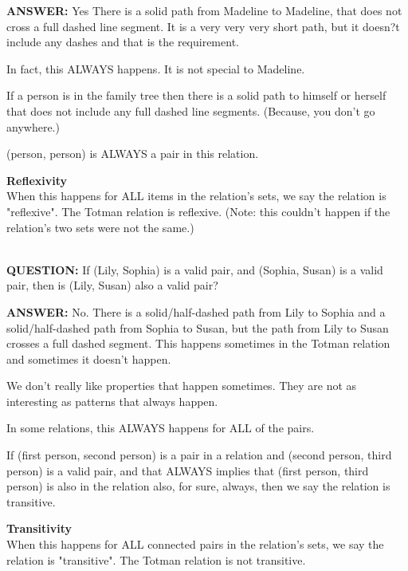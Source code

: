 \documentclass{ximera}
\begin{document}
\textbf{ANSWER:} Yes There is a solid path from Madeline to Madeline, that does not cross a full dashed line segment.  It is a very very very short path, but it doesn?t include any dashes and that is the requirement.

In fact, this ALWAYS happens.  It is not special to Madeline. 

If a person is in the family tree then there is a solid path to himself or herself that does not include any full dashed line segments. (Because, you don't go anywhere.)

(person, person) is ALWAYS a pair in this relation.


\begin{definition} 
\textbf{Reflexivity} \\
When this happens for ALL items in the relation's sets, we say the relation is "reflexive".  The Totman relation is reflexive. (Note: this couldn't happen if the relation's two sets were not the same.)
\end{definition}
\quad \\

\textbf{QUESTION:} If (Lily, Sophia) is a valid pair, and (Sophia, Susan) is a valid pair, then is (Lily, Susan) also a valid pair?

\textbf{ANSWER:} No. There is a solid/half-dashed path from Lily to Sophia and a solid/half-dashed path from Sophia to Susan, but the path from Lily to Susan crosses a full dashed segment. This happens sometimes in the Totman relation and sometimes it doesn't happen.
 
 
 
 
We don't really like properties that happen sometimes. They are not as interesting as patterns that always happen.

In some relations, this ALWAYS happens for ALL of the pairs.  

If (first person, second person) is a pair in a relation and (second person, third person) is a valid pair, and that ALWAYS implies that (first person, third person) is also in the relation also, for sure, always, then we say the relation is transitive.

\begin{definition} 
\textbf{Transitivity} \\
When this happens for ALL connected pairs in the relation's sets, we say the relation is "transitive".  The Totman relation is not transitive.
\end{definition}
\quad \\
\end{document}
